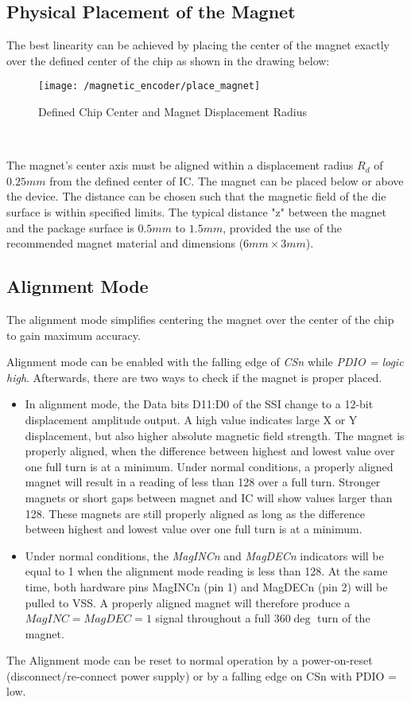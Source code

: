 \subsection{Physical Placement of the Magnet}

The best linearity can be achieved by placing the center of the magnet exactly over the defined center of the chip as shown in the drawing below:

\begin{figure}[h!]
	\begin{center}
		\texttt{[image: /magnetic\_encoder/place\_magnet]}
		\caption{Defined Chip Center and Magnet Displacement Radius}
		\label{Magnet placement}
	\end{center}
\end{figure} 

\

The magnet's center axis must be aligned within a displacement radius $R_d$ of $0.25mm$ from the defined center of IC. The magnet can be placed below or above the device. The distance can be chosen such that the magnetic field of the die surface is within specified limits. The typical distance "z" between the magnet and the package surface is $0.5mm$ to $1.5mm$, provided the use of the recommended magnet material and dimensions ($6mm \times 3mm$).


\subsection{Alignment Mode}\label{Sec:alignment_mode}

The alignment mode simplifies centering the magnet over the center of the chip to gain maximum accuracy.

Alignment mode can be enabled with the falling edge of \textit{CSn} while \textit{PDIO = logic high}. Afterwards, there are two ways to check if the magnet is proper placed.

\begin{itemize}
\item In alignment mode, the Data bits D11:D0 of the SSI change to a 12-bit displacement amplitude output. A high value indicates large X or Y displacement, but also higher absolute magnetic field strength. The magnet is properly aligned, when the difference between highest and lowest value over one full turn is at a minimum. Under normal conditions, a properly aligned magnet will result in a reading of less than 128 over a full turn. Stronger magnets or short gaps between magnet and IC will show values larger than 128. These magnets are still properly aligned as long as the difference between highest and lowest value over one full turn is at a minimum.

\item Under normal conditions, the \textit{MagINCn} and \textit{MagDECn} indicators will be equal to 1 when the alignment mode reading is less than 128. At the same time, both hardware pins MagINCn (pin 1) and MagDECn (pin 2) will be pulled to VSS. A properly aligned magnet will therefore produce a $MagINC=MagDEC=1$ signal throughout a full $360\deg$ turn of the magnet.

\end{itemize}

The Alignment mode can be reset to normal operation by a power-on-reset (disconnect/re-connect power supply) or by a falling edge on CSn with PDIO = low.
